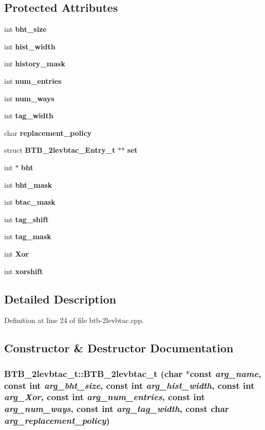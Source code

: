 \subsection*{Protected Attributes}
\begin{CompactItemize}
\item 
int {\bf bht\_\-size}
\item 
int {\bf hist\_\-width}
\item 
int {\bf history\_\-mask}
\item 
int {\bf num\_\-entries}
\item 
int {\bf num\_\-ways}
\item 
int {\bf tag\_\-width}
\item 
char {\bf replacement\_\-policy}
\item 
struct {\bf BTB\_\-2levbtac\_\-Entry\_\-t} $\ast$$\ast$ {\bf set}
\item 
int $\ast$ {\bf bht}
\item 
int {\bf bht\_\-mask}
\item 
int {\bf btac\_\-mask}
\item 
int {\bf tag\_\-shift}
\item 
int {\bf tag\_\-mask}
\item 
int {\bf Xor}
\item 
int {\bf xorshift}
\end{CompactItemize}


\subsection{Detailed Description}


Definition at line 24 of file btb-2levbtac.cpp.

\subsection{Constructor \& Destructor Documentation}
\subsubsection[{BTB\_\-2levbtac\_\-t}]{\setlength{\rightskip}{0pt plus 5cm}BTB\_\-2levbtac\_\-t::BTB\_\-2levbtac\_\-t (char $\ast$const  {\em arg\_\-name}, \/  const int {\em arg\_\-bht\_\-size}, \/  const int {\em arg\_\-hist\_\-width}, \/  const int {\em arg\_\-Xor}, \/  const int {\em arg\_\-num\_\-entries}, \/  const int {\em arg\_\-num\_\-ways}, \/  const int {\em arg\_\-tag\_\-width}, \/  const char {\em arg\_\-replacement\_\-policy})\hspace{0.3cm}{\tt  [inline]}}\label{classBTB__2levbtac__t_36e2ee0f27bd59b849b73400c6a146a2}




